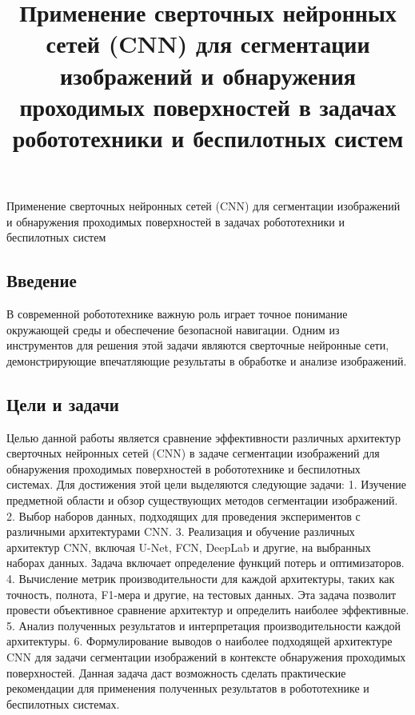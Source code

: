 \documentclass[11pt]{article}
\title{Применение сверточных нейронных сетей (CNN) для сегментации изображений
и обнаружения проходимых поверхностей в задачах робототехники и
беспилотных систем}
\begin{document}
    
    \maketitle
    
    

    
\pagebreak

Применение сверточных нейронных сетей (CNN) для сегментации изображений
и обнаружения проходимых поверхностей в задачах робототехники и
беспилотных систем

    \hypertarget{ux432ux432ux435ux434ux435ux43dux438ux435}{%
\subsection{Введение}\label{ux432ux432ux435ux434ux435ux43dux438ux435}}

    В современной робототехнике важную роль играет точное понимание
окружающей среды и обеспечение безопасной навигации. Одним из
инструментов для решения этой задачи являются сверточные нейронные сети,
демонстрирующие впечатляющие результаты в обработке и анализе
изображений.

    \hypertarget{ux446ux435ux43bux438-ux438-ux437ux430ux434ux430ux447ux438}{%
\subsection{Цели и
задачи}\label{ux446ux435ux43bux438-ux438-ux437ux430ux434ux430ux447ux438}}

    Целью данной работы является сравнение эффективности различных
архитектур сверточных нейронных сетей (CNN) в задаче сегментации
изображений для обнаружения проходимых поверхностей в робототехнике и
беспилотных системах. Для достижения этой цели выделяются следующие
задачи: 1. Изучение предметной области и обзор существующих методов
сегментации изображений. 2. Выбор наборов данных, подходящих для
проведения экспериментов с различными архитектурами CNN. 3. Реализация и
обучение различных архитектур CNN, включая U-Net, FCN, DeepLab и другие,
на выбранных наборах данных. Задача включает определение функций потерь
и оптимизаторов. 4. Вычисление метрик производительности для каждой
архитектуры, таких как точность, полнота, F1-мера и другие, на тестовых
данных. Эта задача позволит провести объективное сравнение архитектур и
определить наиболее эффективные. 5. Анализ полученных результатов и
интерпретация производительности каждой архитектуры. 6. Формулирование
выводов о наиболее подходящей архитектуре CNN для задачи сегментации
изображений в контексте обнаружения проходимых поверхностей. Данная
задача даст возможность сделать практические рекомендации для применения
полученных результатов в робототехнике и беспилотных системах.
\end{document}

